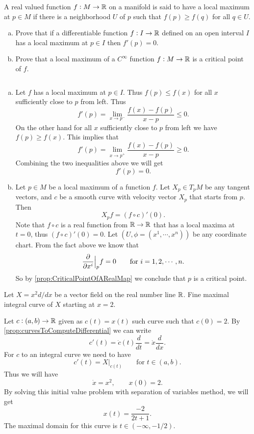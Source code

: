 \begin{problem}
	A real valued function $ f:M\to \mathbb{R} $ on a manifold is said to have a local maximum at $ p \in M $ if there is a neighborhood $ U $ of $ p $ such that $ f(p) \geq f(q) $ for all $ q \in U $.
	\begin{enumerate}[(a)]
		\item Prove that if a differentiable function $ f:I\to \mathbb{R} $ defined on an open interval $ I $ has a local maximum at $ p \in I $ then $ f'(p) = 0 $.
		\item Prove that a local maximum of a $ C^\infty $ function $ f:M\to \mathbb{R} $ is a critical point of $ f $.
	\end{enumerate}
\end{problem}
\begin{solution}
	$\ $
	\begin{enumerate}[(a)]
		\item Let $ f $ has a local maximum at $ p \in I $. Thus $ f(p) \leq f(x) $ for all $ x $ sufficiently close to $ p $ from left. Thus
		\[ f'(p) = \lim_{x \to p^-} \frac{f(x) - f(p)}{x-p} \leq 0. \]
		On the other hand for all $ x $ sufficiently close to $ p $ from left we have $ f(p) \geq f(x) $. This implies that 
		\[ f'(p) = \lim_{x \to p^+} \frac{f(x) - f(p)}{x-p} \geq 0. \]
		Combining the two inequalities above we will get
		\[ f'(p) = 0. \]
		\item Let $ p \in M $ be a local maximum of a function $ f $. Let $ X_p \in T_pM $ be any tangent vectors, and $ c $ be a smooth curve with velocity vector $ X_p $ that starts from $ p $. Then 
		\[ X_p f = (f\circ c)'(0). \]
		Note that $ f\circ c $ is a real function from $ \mathbb{R}\to \mathbb{R} $ that has a local maxima at $ t = 0 $, thus $ (f\circ c)'(0) = 0 $. Let $ (U,\phi = (x^1,\cdots,x^n)) $ be any coordinate chart. From the fact above we know that 
		\[ \frac{\partial}{\partial  x^i}\big|_{p} f = 0 \qquad \text{for $ i = 1,2,\cdots,n $}. \]
		So by \autoref{prop:CriticalPointOfARealMap} we conclude that $ p $ is a critical point.
	\end{enumerate}
\end{solution}


\begin{problem}
	Let $ X = x^2 d/dx $ be a vector field on the real number line $ \mathbb{R} $. Fine maximal integral curve of $ X $ starting at $ x =2 $.
\end{problem}
\begin{solution}
	Let $ c:(a,b) \to \mathbb{R} $ given as $ c(t) = x(t) $ such curve such that $ c(0) = 2 $. By \autoref{prop:curvesToComputeDifferential} we can write
	\[ c'(t) = \dot{c}(t) \frac{d}{dt} = \dot{x} \frac{d}{dx}. \]
	For $ c $ to an integral curve we need to have
	\[ c'(t) = X|_{c(t)} \qquad \text{for } t\in (a,b).  \]
	Thus we will have
	\[ \dot{x} = x^2, \qquad x(0) = 2. \]
	By solving this initial value problem with separation of variables method, we will get
	\[ x(t) = \frac{-2}{2t+1}. \]
	The maximal domain for this curve is $ t \in (-\infty, -1/2) $.
\end{solution}


